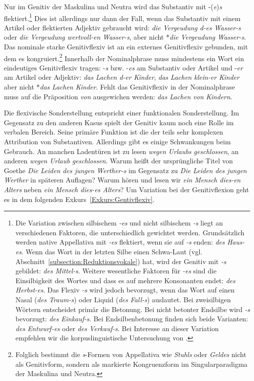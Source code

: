Nur im Genitiv der Maskulina und Neutra wird das Substantiv mit -(\textit{e})\textit{s} flektiert.\footnote{Die Variation zwischen silbischem \textit{-es} und nicht silbischem \textit{-s} liegt an verschiedenen Faktoren, die unterschiedlich gewichtet werden. Grundsätzlich werden native Appellativa mit \textit{-es} flektiert, wenn sie auf \textit{-s} enden: \textit{des Haus-es}. Wenn das Wort in der letzten Silbe einen Schwa-Laut (vgl. Abschnitt~\ref{subsection:Reduktionsvokale}) hat, wird der Genitiv mit \textit{-s} gebildet: \textit{des Mittel-s}. Weitere wesentliche Faktoren für \textit{-es} sind die Einsilbigkeit des Wortes und dass es auf mehrere Konsonanten endet: \textit{des Herbst-es}. Das Flexiv \textit{-s} wird jedoch bevorzugt, wenn das Wort auf einen Nasal (\textit{des Traum-s}) oder Liquid (\textit{des Fall-s}) auslautet. Bei zweisilbigen Wörtern entscheidet primär die Betonung. Bei nicht betonter Endsilbe wird \textit{-s} bevorzugt: \textit{des Einkauf-s}. Bei Endsilbenbetonung finden sich beide Varianten: \textit{des Entwurf-es} oder \textit{des Verkauf-s}. Bei Interesse an dieser Variation empfehlen wir die korpuslinguistische Untersuchung von \citet{Bubenhofer_etal2014}.} Dies ist allerdings nur dann der Fall, wenn das Substantiv mit einem Artikel oder flektierten Adjektiv gebraucht wird: \textit{die Vergeudung d-es Wasser-s} oder \textit{die Vergeudung wertvoll-en Wasser-s}, aber nicht *\textit{die Vergeudung Wasser-s}. Das nominale starke Genitivflexiv ist an ein externes Genitivflexiv gebunden, mit dem es kongruiert.\footnote{Folglich bestimmt \citet[177]{Teuber2000} die \textit{s}-Formen von Appellativa wie \textit{Stuhls} oder \textit{Geldes} nicht als Genitivform, sondern als markierte Kongruenzform im Singularparadigma der Maskulina und Neutra.}  Innerhalb der Nominalphrase muss mindestens ein Wort ein eindeutiges Genitivflexiv tragen: -\textit{s} bzw. -\textit{es} am Substantiv oder Artikel und -\textit{er} am Artikel oder Adjektiv: \textit{das Lachen d-er Kinder}, \textit{das Lachen klein-er Kinder} aber nicht *\textit{das Lachen Kinder}. Fehlt das Genitivflexiv in der Nominalphrase muss \zB auf die Präposition \textit{von} ausgewichen werden: \textit{das Lachen von Kindern}.

Die flexivische Sonderstellung entspricht einer funktionalen Sonderstellung. Im Gegensatz zu den anderen Kasus spielt der Genitiv kaum noch eine Rolle im verbalen Bereich. Seine primäre Funktion ist die der teils sehr komplexen Attribution von Substantiven. Allerdings gibt es einige Schwankungen beim Gebrauch. An manchen Ladentüren ist zu lesen \textit{wegen Urlaubs geschlossen}, an anderen \textit{wegen Urlaub geschlossen}. Warum heißt der ursprüngliche Titel von Goethe \textit{Die Leiden des jungen Werther-s} im Gegensatz zu \textit{Die Leiden des jungen Werther} in späteren Auflagen? Warum hören und lesen wir \textit{ein Mensch dies-en Alters} neben \textit{ein Mensch dies-es Alters}? Um Variation bei der Genitivflexion geht es in dem folgenden Exkurs~\ref{Exkurs:Gentivflexiv}.


